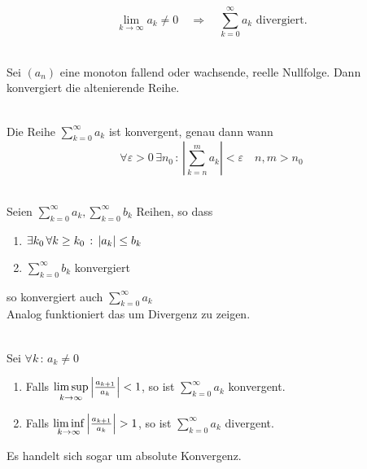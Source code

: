 	\begin{multicols}{2}
		\begin{theorem}[Nullfolge]
			$$ \lim\limits_{k \to \infty} a_k \neq 0 \quad\Rightarrow\quad \sum\limits_{k = 0}^{\infty} a_k \text{ divergiert.}$$
		\end{theorem}
		\begin{theorem}\hfill\\
			Sei $(a_n)$ eine monoton fallend oder wachsende, reelle Nullfolge. Dann konvergiert die altenierende Reihe.
		\end{theorem}
		\begin{theorem}\hfill\\
			 Die Reihe $\sum\limits_{k = 0}^{\infty} a_k$ ist konvergent, genau dann wann $$\forall \varepsilon > 0 \, \exists n_0 \, : \,  \left\vert \sum\limits_{k = n}^m a_k \right\vert < \varepsilon \quad n,m > n_0 $$
		\end{theorem}
		\begin{theorem}[Majorantenkriterium]\hfill\\
			Seien $\sum\limits_{k = 0}^{\infty} a_k, \sum\limits_{k = 0}^{\infty} b_k$ Reihen, so dass
			\begin{enumerate}
				\item $\exists k_0 \, \forall k \geq k_0 \, : \, \left\vert a_k \right\vert \leq b_k$
				\item $\sum\limits_{k = 0}^{\infty} b_k$ konvergiert
			\end{enumerate}
			so konvergiert auch $\sum\limits_{k = 0}^{\infty} a_k$\\
			Analog funktioniert das  um Divergenz zu zeigen.
		\end{theorem}
		\begin{theorem}[Quotientenkriterium]\hfill\\
			Sei $\forall k \, : \, a_k \neq 0$ 
			\begin{enumerate}
				\item Falls $ \limsup\limits_{k \to \infty} \left\vert \frac{a_{k+1}}{a_k} \right\vert < 1 $, so ist $\sum\limits_{k = 0}^{\infty} a_k$ konvergent.
				\item Falls $ \liminf\limits_{k \to \infty} \left\vert \frac{a_{k+1}}{a_k} \right\vert > 1 $, so ist $\sum\limits_{k = 0}^{\infty} a_k$ divergent.
			\end{enumerate}
			Es handelt sich sogar um absolute Konvergenz.
		\end{theorem}
		\begin{theorem}[Wurzelkriterium]\hfill\\

\end{theorem}
\end{multicols}
